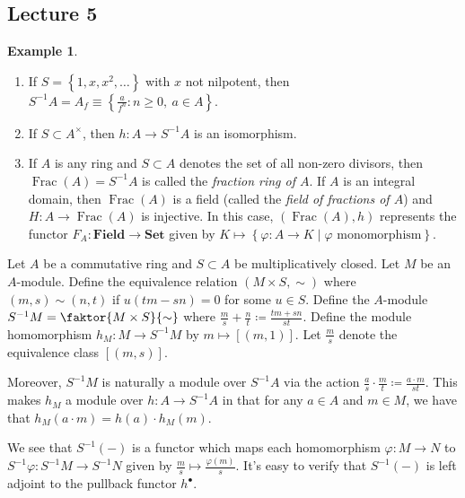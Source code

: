 \documentclass[10pt,letterpaper,cm]{nupset}
\theoremstyle{definition}
\newtheorem{exmp}[definition]{Example}
\theoremstyle{theorem}
\theoremstyle{remark}
\newcommand{\1}{\mathbf{1}}
\newcommand{\0}{\vec 0}
\DeclareMathOperator{\Frac}{Frac}
\begin{document}
\subsection{Lecture 5}

\begin{exmp} $ $
\begin{enumerate}
\item If  $S = \left\{1, x, x^2, \ldots \right\}$ with $x$ not nilpotent, then $S^{-1}A = A_f \equiv \left\{\frac{a}{f^n} : n\geq 0, \ a \in A\right\} $.
\item If $S \subset A^{\times}$, then $h: A \to S^{-1}A$ is an isomorphism. 
\item If $A$ is any ring and $S\subset A$ denotes the set of all non-zero divisors, then $\Frac(A) = S^{-1}A$ is called the \textit{fraction ring of $A$}. If $A$ is an integral domain, then $\Frac(A)$ is a field (called the \textit{field of fractions of $A$}) and $H : A \to \Frac(A)$ is injective. In this case, $\left(\Frac(A), h\right)$ represents the functor $F_A : \mathbf{Field} \to \mathbf{Set}$ given by $K \mapsto \left\{\varphi: A \to K \mid \varphi \text{ monomorphism}\right\}$. 
\end{enumerate}
\end{exmp}

\medskip

Let $A$ be a commutative ring and $S \subset A$ be multiplicatively closed. Let $M$ be an $A$-module. Define the equivalence relation $\left(M \times S, \sim\right)$ where $\left(m, s\right) \sim \left(n, t\right)$ if $u(tm - sn) = 0$ for some $u\in S$. Define the $A$-module $S^{-1}M = \faktor{M \times S}{\sim}$ where $\frac{m}{s} + \frac{n}{t} \coloneqq  \frac{tm + sn}{st}$. Define the module homomorphism $h_M : M \to S^{-1}M$ by $m \mapsto \left[(m,1)\right]$.  Let $\frac{m}{s}$ denote the equivalence class $\left[(m,s)\right]$.

Moreover, $S^{-1}M$ is naturally a module over $S^{-1}A$ via the action $\frac{a}{s} \cdot \frac{m}{t} \coloneqq  \frac{a\cdot m}{st}$. This makes $h_M$ a module over $h: A \to S^{-1}A$ in  that for any $a\in A$ and $m\in M$, we have that $h_M(a\cdot m) = h(a) \cdot h_M(m)$.

We see that $S^{-1}(-)$ is a functor which maps each homomorphism $\varphi : M \to N$ to $S^{-1}\varphi : S^{-1}M \to S^{-1}N$ given by $\frac{m}{s} \mapsto \frac{\varphi(m)}{s}$.  It's easy to verify that $S^{-1}(-)$ is left adjoint to the pullback functor $h^{\bullet}$.

\medskip
\end{document}
